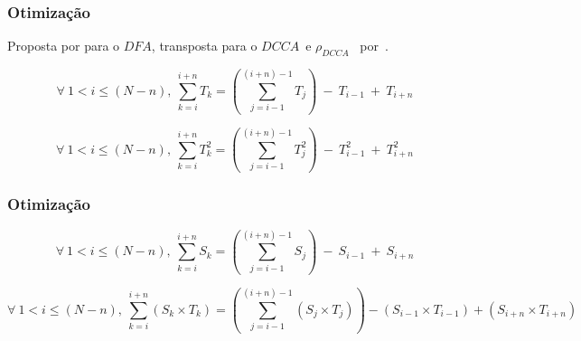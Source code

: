 \documentclass[11pt, aspectratio=169]{beamer}
\newcommand{\pdcca}{\({\rho}_{DCCA}\) }
\newcommand{\dfa}{$DFA$}
\newcommand{\dcca}{$DCCA$}
\begin{document}
\begin{frame}
  \frametitle{Otimização}

  Proposta por  para o \dfa, transposta para o \dcca~e \pdcca~por~.

  \begin{equation}
  \label{eq:sum_opt_x}
  \forall~1<i\leq(N-n),~\sum_{k=i}^{i + n}T_k = \left(\sum_{j=i-1}^{(i+n)-1}T_j\right)~-~T_{i-1}~+~T_{i + n}
\end{equation}

\begin{equation}
  \label{eq:sum_opt_x2}
  \forall~1<i\leq(N-n),~\sum_{k=i}^{i + n}T_k^2 = \left(\sum_{j=i-1}^{(i+n)-1}T_j^2\right)~-~T_{i-1}^2~+~T_{i + n}^2
\end{equation}
\end{frame}

\begin{frame}
  \frametitle{Otimização}

  \begin{equation}
  \label{eq:sum_opt_y}
  \forall~1<i\leq(N-n),~\sum_{k=i}^{i + n}S_k = \left(\sum_{j=i-1}^{(i+n)-1}S_j\right)~-~S_{i-1}~+~S_{i + n}
\end{equation}

\begin{equation}
  \label{eq:sum_opt_xy}
  \forall~1<i\leq(N-n),~\sum_{k=i}^{i + n} (S_k\times T_k) = \left(\sum_{j=i-1}^{(i+n)-1}(S_j \times T_j)\right)-(S_{i-1} \times T_{i-1})+(S_{i + n} \times T_{i + n})
\end{equation}
\end{frame}
\end{document}
